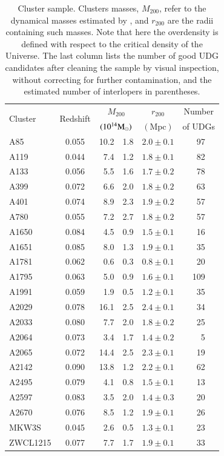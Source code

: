 \documentclass[usenatbib,fleqn]{mnras}
\begin{document}
\begin{table}
 \centering
\caption{Cluster sample. Clusters masses, $M_{200}$, refer to the dynamical masses estimated by \citet{sifon15_cccp}, and $r_{200}$ are the radii containing such masses. Note that here the overdensity is defined with respect to the critical density of the Universe. The last column lists the number of good UDG candidates after cleaning the sample by visual inspection, without correcting for further contamination, and the estimated number of interlopers in parentheses.}
\label{t:clusters}
\begin{tabular}{l c r@{ $\pm$ }l c c}
\hline\hline
 \multirow{2}{*}{Cluster} & \multirow{2}{*}{Redshift} & \multicolumn{2}{c}{$M_{200}$} & $r_{200}$ & Number \\
         &          & \multicolumn{2}{c}{$(10^{14}\mathrm{M}_\odot)$} & $(\mathrm{Mpc})$ & of UDGs  \\[0.5ex]
\hline
%
A85        & 0.055 & 10.2 & 1.8 & $2.0\pm0.1$ &      \,\,\,97 \\
A119       & 0.044 &  7.4 & 1.2 & $1.8\pm0.1$ &      \,\,\,82 \\
A133       & 0.056 &  5.5 & 1.6 & $1.7\pm0.2$ &      \,\,\,78 \\
A399       & 0.072 &  6.6 & 2.0 & $1.8\pm0.2$ &      \,\,\,63 \\
A401       & 0.074 &  8.9 & 2.3 & $1.9\pm0.2$ &      \,\,\,57 \\
A780       & 0.055 &  7.2 & 2.7 & $1.8\pm0.2$ &      \,\,\,57 \\
A1650      & 0.084 &  4.5 & 0.9 & $1.5\pm0.1$ &      \,\,\,16 \\
A1651      & 0.085 &  8.0 & 1.3 & $1.9\pm0.1$ &      \,\,\,35 \\
A1781      & 0.062 &  0.6 & 0.3 & $0.8\pm0.1$ &      \,\,\,20 \\
A1795      & 0.063 &  5.0 & 0.9 & $1.6\pm0.1$ &           109 \\
A1991      & 0.059 &  1.9 & 0.5 & $1.2\pm0.1$ &      \,\,\,35 \\
A2029      & 0.078 & 16.1 & 2.5 & $2.4\pm0.1$ &      \,\,\,34 \\
A2033      & 0.080 &  7.7 & 2.0 & $1.8\pm0.2$ &      \,\,\,25 \\
A2064      & 0.073 &  3.4 & 1.7 & $1.4\pm0.2$ & \,\,\,\,\,\,5 \\
A2065      & 0.072 & 14.4 & 2.5 & $2.3\pm0.1$ &      \,\,\,19 \\
A2142      & 0.090 & 13.8 & 1.2 & $2.2\pm0.1$ &      \,\,\,62 \\
A2495      & 0.079 &  4.1 & 0.8 & $1.5\pm0.1$ &      \,\,\,13 \\
A2597      & 0.083 &  3.5 & 2.0 & $1.4\pm0.3$ &      \,\,\,20 \\
A2670      & 0.076 &  8.5 & 1.2 & $1.9\pm0.1$ &      \,\,\,26 \\
MKW3S      & 0.045 &  2.6 & 0.5 & $1.3\pm0.1$ &      \,\,\,23 \\
ZWCL1215   & 0.077 &  7.7 & 1.7 & $1.9\pm0.1$ &      \,\,\,33 \\
[0.5ex]
\hline
\end{tabular}
\end{table}
\end{document}
